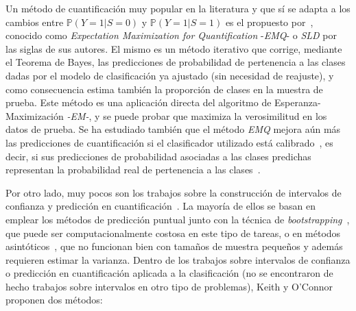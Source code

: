 Un método de cuantificación muy popular en la literatura y que sí se adapta a
los cambios entre $\mathbb{P}(Y=1|S=0)$ y $\mathbb{P}(Y=1|S=1)$ es el propuesto
por~\citet{saerens2002adjusting}, conocido como {\it Expectation Maximization
for Quantification\/} -{\it EMQ\/}- o {\it SLD\/} por las siglas de sus autores.
El mismo es un método iterativo que corrige, mediante el Teorema de Bayes, las
predicciones de probabilidad de pertenencia a las clases dadas por el modelo de
clasificación ya ajustado (sin necesidad de reajuste), y como consecuencia
estima también la proporción de clases en la muestra de prueba. Este método es
una aplicación directa del algoritmo de Esperanza-Maximización {\it -EM-}, y se
puede probar que maximiza la verosimilitud en los datos de prueba. Se ha
estudiado también que el método {\it EMQ\/} mejora aún más las predicciones de
cuantificación si el clasificador utilizado está
calibrado~\cite{esuli2020critical, alexandari2020maximum}, es decir, si sus
predicciones de probabilidad asociadas a las clases predichas representan la
probabilidad real de pertenencia a las clases~\cite{guo2017calibration}.

Por otro lado, muy pocos son los trabajos sobre la construcción de intervalos de
confianza y predicción en cuantificación~\cite{tasche2019confidence}. La mayoría
de ellos se basan en emplear los métodos de predicción puntual junto con la
técnica de {\it bootstrapping\/}~\cite{hopkins2010method,
daughton2020constructing, daughton2021bootstrapping}, que puede ser
computacionalmente costosa en este tipo de tareas, o en métodos
asintóticos~\cite{vaz2019quantification}, que no funcionan bien con tamaños de
muestra pequeños y además requieren estimar la varianza. Dentro de los trabajos
sobre intervalos de confianza o predicción en cuantificación aplicada a la
clasificación (no se encontraron de hecho trabajos sobre intervalos en otro tipo
de problemas), Keith y O'Connor~\cite{keith2018uncertainty} proponen dos
métodos:


